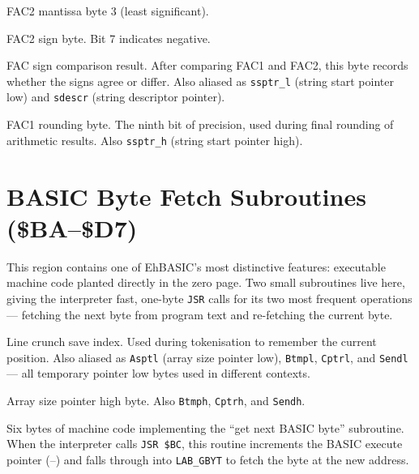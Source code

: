 FAC2 mantissa byte 3 (least significant).


FAC2 sign byte.  Bit 7 indicates negative.


FAC sign comparison result.  After comparing FAC1 and FAC2, this byte records
whether the signs agree or differ.  Also aliased as \texttt{ssptr\_l} (string
start pointer low) and \texttt{sdescr} (string descriptor pointer).


FAC1 rounding byte.  The ninth bit of precision, used during final rounding of
arithmetic results.  Also \texttt{ssptr\_h} (string start pointer high).

\section{BASIC Byte Fetch Subroutines (\$BA--\$D7)}

This region contains one of EhBASIC's most distinctive features: executable
machine code planted directly in the zero page.  Two small subroutines live
here, giving the interpreter fast, one-byte \texttt{JSR} calls for its two
most frequent operations --- fetching the next byte from program text and
re-fetching the current byte.


Line crunch save index.  Used during tokenisation to remember the current
position.  Also aliased as \texttt{Asptl} (array size pointer low),
\texttt{Btmpl}, \texttt{Cptrl}, and \texttt{Sendl} --- all temporary pointer
low bytes used in different contexts.


Array size pointer high byte.  Also \texttt{Btmph}, \texttt{Cptrh}, and
\texttt{Sendh}.


Six bytes of machine code implementing the ``get next BASIC byte'' subroutine.
When the interpreter calls \texttt{JSR \$BC}, this routine increments the
BASIC execute pointer (--) and falls through into
\texttt{LAB\_GBYT} to fetch the byte at the new address.

